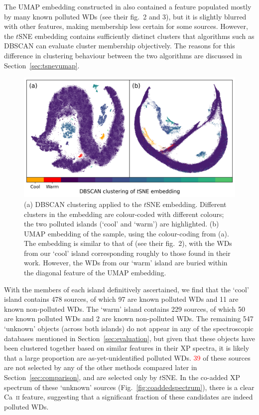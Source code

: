 \documentclass[fleqn,usenatbib]{rasti}
\newcommand{\red}[1]{\textcolor{red}{#1}}
\begin{document}
The UMAP embedding constructed in \citet{kao24} also contained a feature populated mostly by many known polluted WDs (see their fig.~2 and 3), but it is slightly blurred with other features, making membership less certain for some sources.
However, the $t$SNE embedding contains sufficiently distinct clusters that algorithms such as DBSCAN can evaluate cluster membership objectively.
The reasons for this difference in clustering behaviour between the two algorithms are discussed in Section~\ref{sec:tsnevumap}.

\begin{figure}
\centering
\includegraphics[width=\textwidth]{figures/fig2_tsneclustering.png}
\caption{
    (a) DBSCAN clustering applied to the $t$SNE embedding.
    Different clusters in the embedding are colour-coded with different colours; the two polluted islands (`cool' and `warm') are highlighted.
    (b) UMAP embedding of the sample, using the colour-coding from (a).
    The embedding is similar to that of \citet{kao24} (see their fig.~2), with the WDs from our `cool' island corresponding roughly to those found in their work.
    However, the WDs from our `warm' island are buried within the diagonal feature of the UMAP embedding.
}
\label{fig:tsneclustering}
\end{figure}

With the members of each island definitively ascertained, we find that the `cool' island contains 478 sources, of which 97 are known polluted WDs and 11 are known non-polluted WDs.
The `warm' island contains 229 sources, of which 50 are known polluted WDs and 2 are known non-polluted WDs.
The remaining 547 `unknown' objects (across both islands) do not appear in any of the spectroscopic databases mentioned in Section~\ref{sec:evaluation}, but given that these objects have been clustered together based on similar features in their XP spectra, it is likely that a large proportion are as-yet-unidentified polluted WDs.
\red{39} of these sources are not selected by any of the other methods compared later in Section~\ref{sec:comparison}, and are selected only by $t$SNE.
In the co-added XP spectrum of these `unknown' sources (Fig.~\ref{fig:coaddedspectrum}), there is a clear Ca~\textsc{ii} feature, suggesting that a significant fraction of these candidates are indeed polluted WDs.
\end{document}
